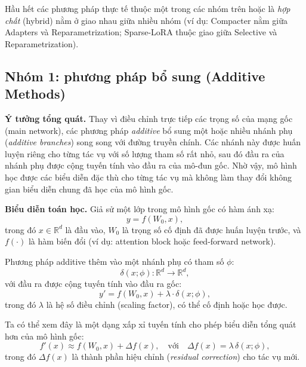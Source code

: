 Hầu hết các phương pháp thực tế thuộc một trong các nhóm trên hoặc là \emph{hợp chất} (hybrid) nằm ở giao nhau giữa nhiều nhóm (ví dụ: Compacter nằm giữa Adapters và Reparametrization; Sparse-LoRA thuộc giao giữa Selective và Reparametrization).

\begin{center}
	\label{fig:peft_5groups}
\end{center}

\subsection{Nhóm 1: phương pháp bổ sung (Additive Methods)}
\label{ssec:additive}

\textbf{Ý tưởng tổng quát.}
Thay vì điều chỉnh trực tiếp các trọng số của mạng gốc (main network), các phương pháp \textit{additive} bổ sung một hoặc nhiều nhánh phụ (\textit{additive branches}) song song với đường truyền chính. Các nhánh này được huấn luyện riêng cho từng tác vụ với số lượng tham số rất nhỏ, sau đó đầu ra của nhánh phụ được cộng tuyến tính vào đầu ra của mô-đun gốc.
Nhờ vậy, mô hình học được các biểu diễn đặc thù cho từng tác vụ mà không làm thay đổi không gian biểu diễn chung đã học của mô hình gốc.

\textbf{Biểu diễn toán học.}  
Giả sử một lớp trong mô hình gốc có hàm ánh xạ:
\[
y = f(W_0, x),
\]
trong đó $x \in \mathbb{R}^d$ là đầu vào, $W_0$ là trọng số cố định đã được huấn luyện trước, và $f(\cdot)$ là hàm biến đổi (ví dụ: attention block hoặc feed-forward network).  

Phương pháp additive thêm vào một nhánh phụ có tham số $\phi$:
\[
\delta(x; \phi): \mathbb{R}^d \rightarrow \mathbb{R}^d,
\]
với đầu ra được cộng tuyến tính vào đầu ra gốc:
\[
y' = f(W_0, x) + \lambda \cdot \delta(x; \phi),
\]
trong đó $\lambda$ là hệ số điều chỉnh (scaling factor), có thể cố định hoặc học được.  

Ta có thể xem đây là một dạng xấp xỉ tuyến tính cho phép biểu diễn tổng quát hơn của mô hình gốc:
\[
f'(x) \approx f(W_0, x) + \Delta f(x), \quad \text{với} \quad \Delta f(x) = \lambda \, \delta(x; \phi),
\]
trong đó $\Delta f(x)$ là thành phần hiệu chỉnh (\textit{residual correction}) cho tác vụ mới.

